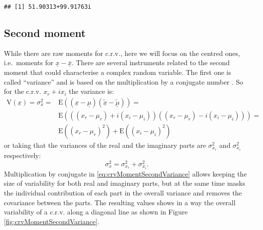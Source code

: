 \documentclass[
]{book}
\begin{document}
\begin{verbatim}
## [1] 51.90313+99.91763i
\end{verbatim}

\hypertarget{crvSecondMoment}{%
\subsection{Second moment}\label{crvSecondMoment}}

While there are raw moments for c.r.v., here we will focus on the centred ones, i.e.~moments for \(\underline{x}-\bar{\underline{x}}\). There are several instruments related to the second moment that could characterise a complex random variable. The first one is called ``variance'' and is based on the multiplication by a conjugate number \citep{Panchev1971}. So for the c.r.v. \(x_r + i x_i\) the variance is:
\begin{equation}
    \begin{aligned}
    \mathrm{V}(\underline{x}) = \sigma_x^2 = & \mathrm{E}((\underline{x}-\underline{\mu}) (\tilde{\underline{x}}-\tilde{\underline{\mu}})) = \\
                 & \mathrm{E}\left(((x_r-\mu_{r}) + i (x_i-\mu_{i}))((x_r-\mu_{r}) - i (x_i-\mu_{i}))\right) = \\
                 & \mathrm{E}((x_r-\mu_{r})^2) +  \mathrm{E}((x_i-\mu_{i})^2)
    \end{aligned}
    \label{eq:crvMomentSecondVariance}
\end{equation}
or taking that the variances of the real and the imaginary parts are \(\sigma_{x_r}^2\) and \(\sigma_{x_i}^2\) respectively:
\begin{equation}
    \sigma_x^2 = \sigma_{x_r}^2 + \sigma_{x_i}^2.
    \label{eq:crvMomentSecondVarianceShort}
\end{equation}
Multiplication by conjugate in \eqref{eq:crvMomentSecondVariance} allows keeping the size of variability for both real and imaginary parts, but at the same time masks the individual contribution of each part in the overall variance and removes the covariance between the parts. The resulting values shows in a way the overall variability of a c.r.v. along a diagonal line as shown in Figure \ref{fig:crvMomentSecondVariance}.
\end{document}
